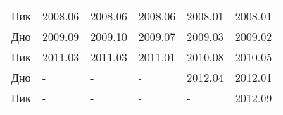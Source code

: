 \documentclass[a4paper,14pt]{extreport}
\begin{document}
\begin{table}[]
\begin{tabular}{|l|l|l|l|l|l|}
				Пик                                                                                                   & 2008.06                                                                                                                                                    & 2008.06                                                                    & 2008.06                                                                          & 2008.01                                                                   & 2008.01                                                                          \\
				Дно                                                                                                   & 2009.09                                                                                                                                                    & 2009.10                                                                    & 2009.07                                                                          & 2009.03                                                                   & 2009.02                                                                          \\ \hline
				Пик                                                                                                   & 2011.03                                                                                                                                                    & 2011.03                                                                    & 2011.01                                                                          & 2010.08                                                                   & 2010.05                                                                          \\
				Дно                                                                                                   & -                                                                                                                                                          & -                                                                          & -                                                                                & 2012.04                                                                   & 2012.01                                                                          \\ \hline
				Пик                                                                                                   & -                                                                                                                                                          & -                                                                          & -                                                                                & -                                                                         & 2012.09                                                                          \\

\end{tabular}
\end{table}
\end{document}
